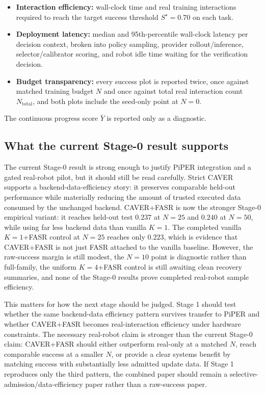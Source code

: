 \documentclass[10pt]{article}
\theoremstyle{plain}
\theoremstyle{definition}
\theoremstyle{remark}
\begin{document}
\begin{itemize}
    \item \textbf{Interaction efficiency:} wall-clock time and real training interactions required to reach the target success threshold $S^\star=0.70$ on each task.
    \item \textbf{Deployment latency:} median and 95th-percentile wall-clock latency per decision context, broken into policy sampling, provider rollout/inference, selector/calibrator scoring, and robot idle time waiting for the verification decision.
    \item \textbf{Budget transparency:} every success plot is reported twice, once against matched training budget $N$ and once against total real interaction count $N_{\mathrm{total}}$, and both plots include the seed-only point at $N=0$.
\end{itemize}
The continuous progress score $\bar Y$ is reported only as a diagnostic.

\subsection{What the current Stage-0 result supports}
The current Stage-0 result is strong enough to justify PiPER integration and a gated real-robot pilot, but it should still be read carefully. Strict CAVER supports a backend-data-efficiency story: it preserves comparable held-out performance while materially reducing the amount of trusted executed data consumed by the unchanged backend. CAVER+FASR is now the stronger Stage-0 empirical variant: it reaches held-out test $0.237$ at $N=25$ and $0.240$ at $N=50$, while using far less backend data than vanilla $K=1$. The completed vanilla $K=1$+FASR control at $N=25$ reaches only $0.223$, which is evidence that CAVER+FASR is not just FASR attached to the vanilla baseline. However, the raw-success margin is still modest, the $N=10$ point is diagnostic rather than full-family, the uniform $K=4$+FASR control is still awaiting clean recovery summaries, and none of the Stage-0 results prove completed real-robot sample efficiency.

This matters for how the next stage should be judged. Stage 1 should test whether the same backend-data efficiency pattern survives transfer to PiPER and whether CAVER+FASR becomes real-interaction efficiency under hardware constraints. The necessary real-robot claim is stronger than the current Stage-0 claim: CAVER+FASR should either outperform real-only at a matched $N$, reach comparable success at a smaller $N$, or provide a clear systems benefit by matching success with substantially less admitted update data. If Stage 1 reproduces only the third pattern, the combined paper should remain a selective-admission/data-efficiency paper rather than a raw-success paper.
\end{document}
